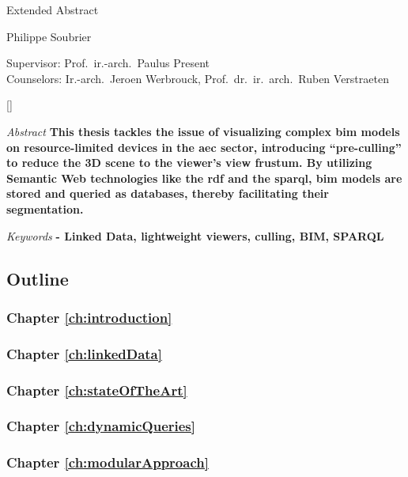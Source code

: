 \begin{center}
    \sffamily
    \huge Extended Abstract

    \Large Philippe Soubrier

    \normalsize
    Supervisor: Prof.\ ir.-arch.\ Paulus Present\\
    Counselors: Ir.-arch.\ Jeroen Werbrouck, Prof.\ dr.\ ir.\ arch.\ Ruben Verstraeten
\end{center}
\begin{refsection}
    []{}
    \begin{multicols}{2}
        \small
        \emph{Abstract} \textbf{
            This thesis tackles the issue of visualizing complex \ac{bim} models on resource-limited devices in the \ac{aec} sector, introducing \enquote{pre-culling} to reduce the 3D scene to the viewer's view frustum. By utilizing Semantic Web technologies like the \ac{rdf} and the \ac{sparql}, \ac{bim} models are stored and queried as databases, thereby facilitating their segmentation.
        }

        \emph{Keywords} \textbf{
            - Linked Data, lightweight viewers, culling, BIM, SPARQL
        }

        \lipsum[1-2]
        \cite{Bonduel2019}

        \subsection*{Outline}
        \lipsum[4]
        \subsubsection*{Chapter \ref{ch:introduction}}
        \lipsum[5]
        \subsubsection*{Chapter \ref{ch:linkedData}}
        \lipsum[6]
        \subsubsection*{Chapter \ref{ch:stateOfTheArt}}
        \lipsum[7]
        \subsubsection*{Chapter \ref{ch:dynamicQueries}}
        \lipsum[8]
        \subsubsection*{Chapter \ref{ch:modularApproach}}
        \lipsum[9]

\end{multicols}
\end{refsection}
